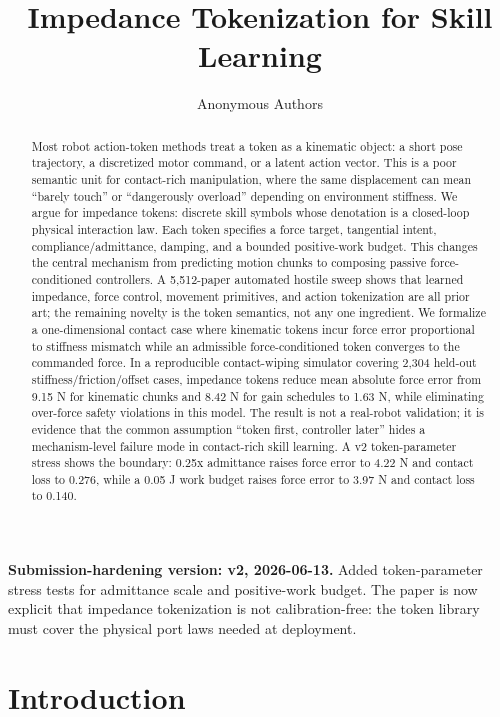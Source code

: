 \documentclass{article}
\title{Impedance Tokenization for Skill Learning}
\author{Anonymous Authors}
\begin{document}
\maketitle
\noindent\textbf{Submission-hardening version: v2, 2026-06-13.}
Added token-parameter stress tests for admittance scale and positive-work budget.
The paper is now explicit that impedance tokenization is not calibration-free:
the token library must cover the physical port laws needed at deployment.

\begin{abstract}
Most robot action-token methods treat a token as a kinematic object: a short pose trajectory, a discretized motor command, or a latent action vector. This is a poor semantic unit for contact-rich manipulation, where the same displacement can mean ``barely touch'' or ``dangerously overload'' depending on environment stiffness. We argue for impedance tokens: discrete skill symbols whose denotation is a closed-loop physical interaction law. Each token specifies a force target, tangential intent, compliance/admittance, damping, and a bounded positive-work budget. This changes the central mechanism from predicting motion chunks to composing passive force-conditioned controllers. A 5,512-paper automated hostile sweep shows that learned impedance, force control, movement primitives, and action tokenization are all prior art; the remaining novelty is the token semantics, not any one ingredient. We formalize a one-dimensional contact case where kinematic tokens incur force error proportional to stiffness mismatch while an admissible force-conditioned token converges to the commanded force. In a reproducible contact-wiping simulator covering 2,304 held-out stiffness/friction/offset cases, impedance tokens reduce mean absolute force error from 9.15 N for kinematic chunks and 8.42 N for gain schedules to 1.63 N, while eliminating over-force safety violations in this model. The result is not a real-robot validation; it is evidence that the common assumption ``token first, controller later'' hides a mechanism-level failure mode in contact-rich skill learning.
A v2 token-parameter stress shows the boundary: 0.25x admittance raises force error
to 4.22 N and contact loss to 0.276, while a 0.05 J work budget raises force error
to 3.97 N and contact loss to 0.140.
\end{abstract}

\section{Introduction}
\end{document}
